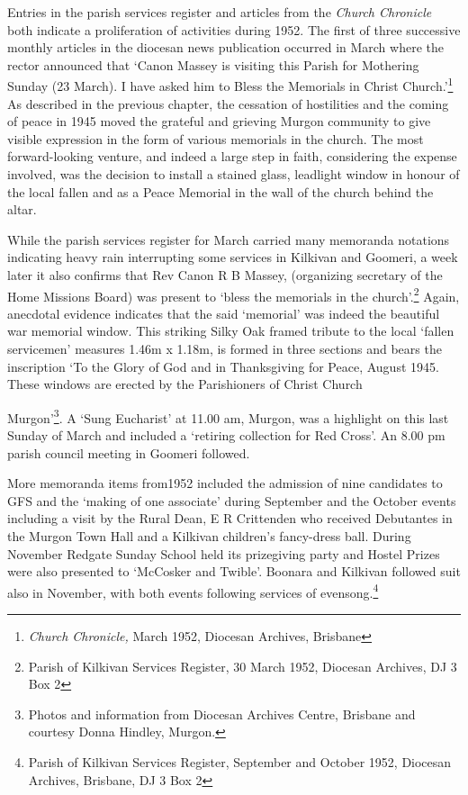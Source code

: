 Entries in the parish services register and articles from the \emph{Church Chronicle} both indicate a proliferation of activities during 1952. The first of three successive monthly articles in the diocesan news publication occurred in March where the rector announced that `Canon Massey is visiting this Parish for Mothering Sunday (23 March). I have asked him to Bless the Memorials in Christ Church.'\footnote{\emph{Church Chronicle,} March 1952, Diocesan Archives, Brisbane} As described in the previous chapter, the cessation of hostilities and the coming of peace in 1945 moved the grateful and grieving Murgon community to give visible expression in the form of various memorials in the church. The most forward-looking venture, and indeed a large step in faith, considering the expense involved, was the decision to install a stained glass, leadlight window in honour of the local fallen and as a Peace Memorial in the wall of the church behind the altar.

While the parish services register for March carried many memoranda notations indicating heavy rain interrupting some services in Kilkivan and Goomeri, a week later it also confirms that Rev Canon R B Massey, (organizing secretary of the Home Missions Board) was present to `bless the memorials in the church'.\footnote{Parish of Kilkivan Services Register, 30 March 1952, Diocesan Archives, DJ 3 Box 2} Again, anecdotal evidence indicates that the said `memorial' was indeed the beautiful war memorial window. This striking Silky Oak framed tribute to the local `fallen servicemen' measures 1.46m x 1.18m, is formed in three sections and bears the inscription `To the Glory of God and in Thanksgiving for Peace, August 1945. These windows are erected by the Parishioners of Christ Church

Murgon'\footnote{Photos and information from Diocesan Archives Centre, Brisbane and courtesy Donna Hindley, Murgon.}. A `Sung Eucharist' at 11.00 am, Murgon, was a highlight on this last Sunday of March and included a `retiring collection for Red Cross'. An 8.00 pm parish council meeting in Goomeri followed.

More memoranda items from1952 included the admission of nine candidates to GFS and the `making of one associate' during September and the October events including a visit by the Rural Dean, E R Crittenden who received Debutantes in the Murgon Town Hall and a Kilkivan children's fancy-dress ball. During November Redgate Sunday School held its prizegiving party and Hostel Prizes were also presented to `McCosker and Twible'. Boonara and Kilkivan followed suit also in November, with both events following services of evensong.\footnote{Parish of Kilkivan Services Register, September and October 1952, Diocesan Archives, Brisbane, DJ 3 Box 2}

